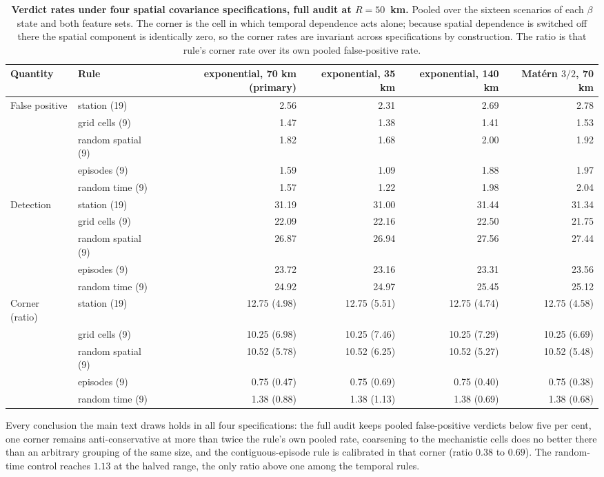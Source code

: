 \documentclass[11pt]{article}
\begin{document}
\begin{table}[htbp]\centering\footnotesize
\caption{\textbf{Verdict rates under four spatial covariance specifications, full audit at $R=50$~km.}
Pooled over the sixteen scenarios of each $\beta$ state and both feature sets. The corner is the
cell in which temporal dependence acts alone; because spatial dependence is switched off there the
spatial component is identically zero, so the corner rates are invariant across specifications by
construction. The ratio is that rule's corner rate over its own pooled false-positive rate.}
\label{si:cov}
\begin{tabular}{llrrrr}\toprule
Quantity & Rule & exponential, 70 km (primary) & exponential, 35 km & exponential, 140 km & Mat\'ern $3/2$, 70 km \\ \midrule
False positive & station (19) & 2.56 & 2.31 & 2.69 & 2.78 \\
 & grid cells (9) & 1.47 & 1.38 & 1.41 & 1.53 \\
 & random spatial (9) & 1.82 & 1.68 & 2.00 & 1.92 \\
 & episodes (9) & 1.59 & 1.09 & 1.88 & 1.97 \\
 & random time (9) & 1.57 & 1.22 & 1.98 & 2.04 \\
\addlinespace
Detection & station (19) & 31.19 & 31.00 & 31.44 & 31.34 \\
 & grid cells (9) & 22.09 & 22.16 & 22.50 & 21.75 \\
 & random spatial (9) & 26.87 & 26.94 & 27.56 & 27.44 \\
 & episodes (9) & 23.72 & 23.16 & 23.31 & 23.56 \\
 & random time (9) & 24.92 & 24.97 & 25.45 & 25.12 \\
\addlinespace
Corner (ratio) & station (19) & 12.75 (4.98) & 12.75 (5.51) & 12.75 (4.74) & 12.75 (4.58) \\
 & grid cells (9) & 10.25 (6.98) & 10.25 (7.46) & 10.25 (7.29) & 10.25 (6.69) \\
 & random spatial (9) & 10.52 (5.78) & 10.52 (6.25) & 10.52 (5.27) & 10.52 (5.48) \\
 & episodes (9) & 0.75 (0.47) & 0.75 (0.69) & 0.75 (0.40) & 0.75 (0.38) \\
 & random time (9) & 1.38 (0.88) & 1.38 (1.13) & 1.38 (0.69) & 1.38 (0.68) \\
\bottomrule\end{tabular}
\end{table}

Every conclusion the main text draws holds in all four specifications: the full audit keeps pooled
false-positive verdicts below five per cent, one corner remains anti-conservative at more than
twice the rule's own pooled rate, coarsening to the mechanistic cells does no better there than an
arbitrary grouping of the same size, and the contiguous-episode rule is calibrated in that corner
(ratio $0.38$ to $0.69$). The random-time control reaches $1.13$ at the halved range, the only
ratio above one among the temporal rules.
\end{document}

